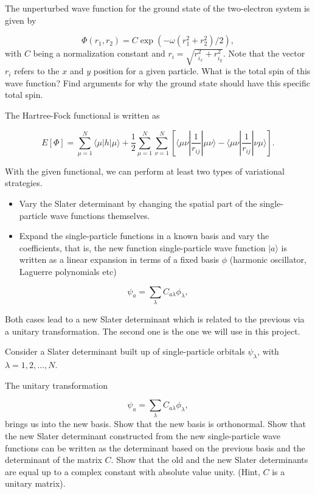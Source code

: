 \documentclass[%
oneside,                 %
final,                   %
10pt]{article}
\begin{document}
The unperturbed wave function for the ground state of the two-electron system is given by

\begin{equation*}
\Phi(r_1,r_2) = C\exp{\left(-\omega(r_1^2+r_2^2)/2\right)},
\end{equation*}
with $C$ being a normalization constant and $r_i = \sqrt{r_{i_x}^2+r_{i_y}^2}$. Note that the vector $r_i$ 
refers to the $x$ and $y$ position for a given particle.
What is the total spin of this wave function? Find arguments for why the ground state should have
this specific total spin. 

The Hartree-Fock functional is written as

\begin{equation*}
  E[\Phi] 
  = \sum_{\mu=1}^N \langle \mu | h | \mu\rangle+ \frac{1}{2}\sum_{\mu=1}^N\sum_{\nu=1}^N\left[\langle \mu\nu |\frac{1}{r_{ij}}|\mu\nu\rangle-\langle \mu\nu |\frac{1}{r_{ij}}|\nu\mu\rangle\right].
\end{equation*}

With the given functional, we can perform at least two types of variational strategies.

\begin{itemize}
  \item Vary the Slater determinant by changing the spatial part of the single-particle wave functions themselves.

  \item Expand the single-particle functions in a known basis  and vary the coefficients,  that is, the new function single-particle wave function $|a\rangle$ is written as a linear expansion in terms of a fixed basis $\phi$ (harmonic oscillator, Laguerre polynomials etc)  
\end{itemize}

\noindent
\begin{equation*} 
\psi_a  = \sum_{\lambda} C_{a\lambda}\phi_{\lambda},
\end{equation*}

Both cases lead to a new Slater determinant which is related to the previous via  a unitary transformation.
The second one is the one we will use in this project.


Consider a Slater determinant built up of single-particle orbitals 
$\psi_{\lambda}$,  with $\lambda = 1,2,\dots,N$.

The unitary transformation

\begin{equation*}
\psi_a  = \sum_{\lambda} C_{a\lambda}\phi_{\lambda},
\end{equation*}
brings us into the new basis.  Show that the new basis is orthonormal.
Show that the new Slater determinant constructed from the new single-particle wave functions can be
written as the determinant based on the previous basis and the determinant of the matrix $C$.
Show that the old and the new Slater determinants are equal up to a complex constant with absolute value unity.
(Hint, $C$ is a unitary matrix). 
\end{document}
